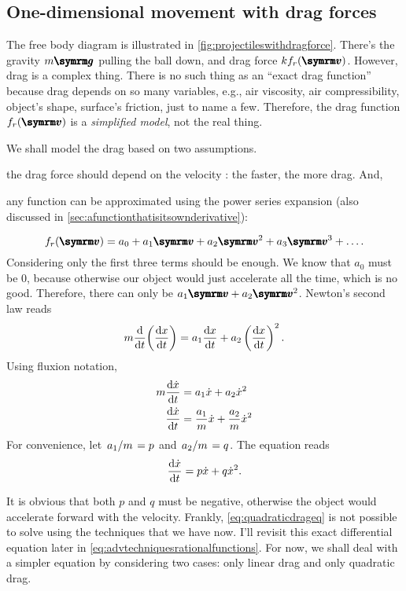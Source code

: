 \subsection{One-dimensional movement with drag forces}

The free body diagram is illustrated in \cref{fig:projectileswithdragforce}. There's the gravity $m\vv{g}$ pulling the ball down, and drag force $kf_r(\vv{v})$. However, drag is a complex thing. There is no such thing as an ``exact drag function'' because drag depends on so many variables, e.g., air viscosity, air compressibility, object's shape, surface's friction, just to name a few. Therefore, the drag function $f_r(\vv{v})$ is a \emph{simplified model}, not the real thing.

We shall model the drag based on two assumptions. \begin{enumerate*}[label = \roman*.)]
    \item the drag force should depend on the velocity : the faster, the more drag. And,
    \item any function can be approximated using the power series expansion (also discussed in \cref{sec:afunctionthatisitsownderivative}):
\end{enumerate*}
\begin{equation*}
    f_r(\vv{v}) = a_0 + a_1\vv{v} + a_2\vv{v}^2 + a_3\vv{v}^3 + \dots.
\end{equation*}
Considering only the first three terms should be enough. We know that $a_0$ must be $0$, because otherwise our object would just accelerate all the time, which is no good. Therefore, there can only be $a_1\vv{v} + a_2\vv{v}^2$. Newton's second law reads
\begin{equation*}
    m\dv{t}(\dv{x}{t}) = a_1\dv{x}{t} + a_2\left(\dv{x}{t}\right)^2.
\end{equation*}
Using fluxion notation,
\begin{align*}
    m\dv{\dot{x}}{t} &= a_1\dot{x} + a_2\dot{x}^2 \\
    \dv{\dot{x}}{t} &= \frac{a_1}{m}\dot{x} + \frac{a_2}{m}\dot{x}^2
\end{align*}
For convenience, let $\flatfrac{a_1}{m} = p$ and $\flatfrac{a_2}{m} = q$. The equation reads
\begin{equation}
    \dv{\dot{x}}{t} = p\dot{x} + q\dot{x}^2. \label{eq:quadraticdrageq}
\end{equation}

It is obvious that both $p$ and $q$ must be negative, otherwise the object would accelerate forward with the velocity. Frankly, \cref{eq:quadraticdrageq} is not possible to solve using the techniques that we have now. I'll revisit this exact differential equation later in \cref{eq:advtechniquesrationalfunctions}. For now, we shall deal with a simpler equation by considering two cases: only linear drag and only quadratic drag.

